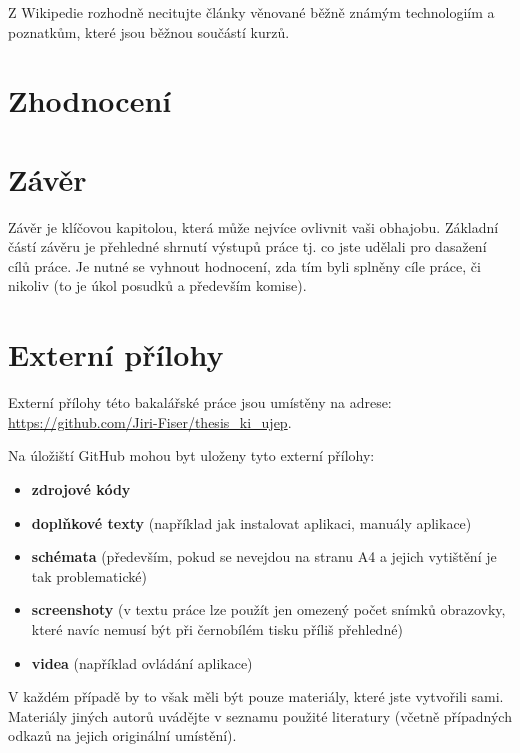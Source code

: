 \documentclass[male,czech,api_bc]{kitheses}
\begin{document}
Z Wikipedie rozhodně necitujte články věnované běžně známým technologiím a poznatkům, které jsou běžnou součástí kurzů. 

\chapter{Zhodnocení} 

\chapter{Závěr}

Závěr je klíčovou kapitolou, která může nejvíce ovlivnit vaši obhajobu. Základní částí závěru je přehledné shrnutí výstupů práce tj. co jste udělali pro dasažení cílů práce. Je nutné se vyhnout hodnocení, zda tím byli splněny cíle práce, či nikoliv (to je úkol posudků a především komise).

\sloppy
\printbibliography[title=Seznam použitých zdrojů]

\appendix

\chapter{Externí přílohy\label{sec:ep}}

Externí přílohy této bakalářské práce jsou umístěny na adrese:\\ \url{https://github.com/Jiri-Fiser/thesis_ki_ujep}.

Na úložiští GitHub mohou byt uloženy tyto externí přílohy:

\begin{itemize}
\item \textbf{zdrojové kódy}
\item \textbf{doplňkové texty} (například jak instalovat aplikaci, manuály aplikace)
\item \textbf{schémata} (především, pokud se nevejdou na stranu A4 a jejich vytištění je tak problematické)
\item \textbf{screenshoty} (v textu práce lze použít jen omezený počet snímků obrazovky, které navíc nemusí být při černobílém tisku příliš přehledné)
\item \textbf{videa} (například ovládání aplikace)
\end{itemize}

V každém případě by to však měli být pouze materiály, které jste vytvořili sami. Materiály jiných autorů uvádějte v seznamu použité literatury (včetně případných odkazů na jejich originální umístění).
\end{document}
